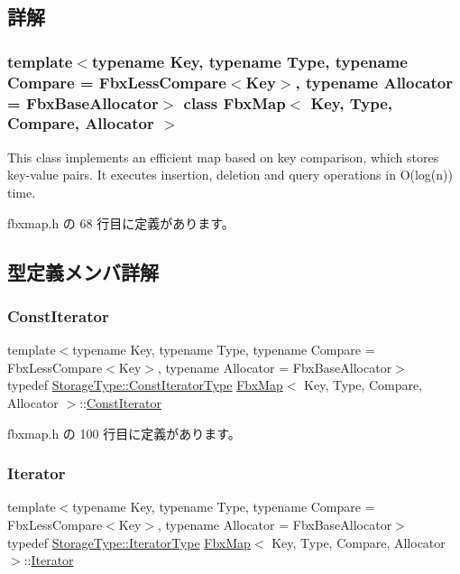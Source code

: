 \subsection{詳解}
\subsubsection*{template$<$typename Key, typename Type, typename Compare = Fbx\+Less\+Compare$<$\+Key$>$, typename Allocator = Fbx\+Base\+Allocator$>$\newline
class Fbx\+Map$<$ Key, Type, Compare, Allocator $>$}

This class implements an efficient map based on key comparison, which stores key-\/value pairs. It executes insertion, deletion and query operations in O(log(n)) time. 

 fbxmap.\+h の 68 行目に定義があります。



\subsection{型定義メンバ詳解}
\mbox{\label{class_fbx_map_acf89f4bb5cf415e5e04087c2179bf367}} 
\subsubsection{\texorpdfstring{Const\+Iterator}{ConstIterator}}
{\footnotesize\ttfamily template$<$typename Key, typename Type, typename Compare = Fbx\+Less\+Compare$<$\+Key$>$, typename Allocator = Fbx\+Base\+Allocator$>$ \\
typedef \hyperlink{class_fbx_red_black_tree_a7309ae5e1bb24e7e3da94fef975d10c4}{Storage\+Type\+::\+Const\+Iterator\+Type} \hyperlink{class_fbx_map}{Fbx\+Map}$<$ Key, Type, Compare, Allocator $>$\+::\hyperlink{class_fbx_map_acf89f4bb5cf415e5e04087c2179bf367}{Const\+Iterator}}



 fbxmap.\+h の 100 行目に定義があります。

\mbox{\label{class_fbx_map_ab0989f3b30c0c8652ff9ee1b28b5c1af}} 
\subsubsection{\texorpdfstring{Iterator}{Iterator}}
{\footnotesize\ttfamily template$<$typename Key, typename Type, typename Compare = Fbx\+Less\+Compare$<$\+Key$>$, typename Allocator = Fbx\+Base\+Allocator$>$ \\
typedef \hyperlink{class_fbx_red_black_tree_af7b6209131012ec5aa33e0286c956cd6}{Storage\+Type\+::\+Iterator\+Type} \hyperlink{class_fbx_map}{Fbx\+Map}$<$ Key, Type, Compare, Allocator $>$\+::\hyperlink{class_fbx_map_ab0989f3b30c0c8652ff9ee1b28b5c1af}{Iterator}}



